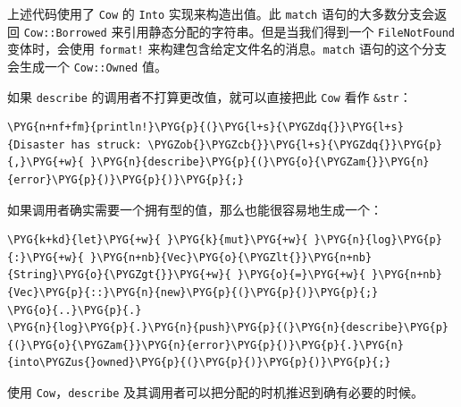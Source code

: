 上述代码使用了 \texttt{Cow} 的 \texttt{Into} 实现来构造出值。此 \texttt{match} 语句的大多数分支会返回 \texttt{Cow::Borrowed} 来引用静态分配的字符串。但是当我们得到一个 \texttt{FileNotFound} 变体时，会使用 \texttt{format!} 来构建包含给定文件名的消息。\texttt{match} 语句的这个分支会生成一个 \texttt{Cow::Owned} 值。

如果 \texttt{describe} 的调用者不打算更改值，就可以直接把此 \texttt{Cow} 看作 \texttt{\&str}：

\begin{Verbatim}[commandchars=\\\{\},breaklines=true,breakanywhere=true,fontsize=\codefont,xleftmargin=17bp]
\PYG{n+nf+fm}{println!}\PYG{p}{(}\PYG{l+s}{\PYGZdq{}}\PYG{l+s}{Disaster has struck: \PYGZob{}\PYGZcb{}}\PYG{l+s}{\PYGZdq{}}\PYG{p}{,}\PYG{+w}{ }\PYG{n}{describe}\PYG{p}{(}\PYG{o}{\PYGZam{}}\PYG{n}{error}\PYG{p}{)}\PYG{p}{)}\PYG{p}{;}
\end{Verbatim}

如果调用者确实需要一个拥有型的值，那么也能很容易地生成一个：

\begin{Verbatim}[commandchars=\\\{\},breaklines=true,breakanywhere=true,fontsize=\codefont,xleftmargin=17bp]
\PYG{k+kd}{let}\PYG{+w}{ }\PYG{k}{mut}\PYG{+w}{ }\PYG{n}{log}\PYG{p}{:}\PYG{+w}{ }\PYG{n+nb}{Vec}\PYG{o}{\PYGZlt{}}\PYG{n+nb}{String}\PYG{o}{\PYGZgt{}}\PYG{+w}{ }\PYG{o}{=}\PYG{+w}{ }\PYG{n+nb}{Vec}\PYG{p}{::}\PYG{n}{new}\PYG{p}{(}\PYG{p}{)}\PYG{p}{;}
\PYG{o}{..}\PYG{p}{.}
\PYG{n}{log}\PYG{p}{.}\PYG{n}{push}\PYG{p}{(}\PYG{n}{describe}\PYG{p}{(}\PYG{o}{\PYGZam{}}\PYG{n}{error}\PYG{p}{)}\PYG{p}{.}\PYG{n}{into\PYGZus{}owned}\PYG{p}{(}\PYG{p}{)}\PYG{p}{)}\PYG{p}{;}
\end{Verbatim}

使用 \texttt{Cow}，\texttt{describe} 及其调用者可以把分配的时机推迟到确有必要的时候。

